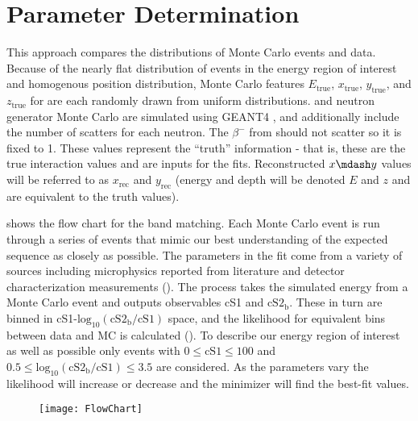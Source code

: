\section{Parameter Determination}
\label{sec:er_nr_calibrations_parameter_determ}
This approach compares the distributions of Monte Carlo events and data.  Because of the nearly flat distribution of events in the energy
region of interest and homogenous position distribution, Monte Carlo features $E_{\mathrm{true}}$, $x_{\mathrm{true}}$,
$y_{\mathrm{true}}$, and $z_{\mathrm{true}}$ for  are each randomly drawn from uniform distributions.   and
neutron generator Monte Carlo are simulated using GEANT4 , and additionally include the number of
scatters for each neutron.  The $\beta^-$ from  should not scatter so it is fixed to 1.  These values represent the
``truth'' information - that is, these are the true interaction values and are inputs for the fits.  Reconstructed $x \mdash y$ values
will be referred to as $x_{\mathrm{rec}}$
and $y_{\mathrm{rec}}$ (energy and depth will be denoted $E$ and $z$ and are equivalent to the truth values).

 shows the flow chart for the band matching.  Each Monte Carlo event is run
through a series of events that mimic our best understanding of the expected sequence as closely as possible.  The parameters in the fit
come from
a variety of sources including microphysics reported from literature and detector characterization measurements
().  The process takes the simulated energy from a Monte Carlo event and outputs observables cS1 and
$\mathrm{cS2_b}$.  These in turn are binned in cS1-$\mathrm{log_{10}(cS2_b / cS1)}$ space, and the likelihood for equivalent bins
between data and MC is calculated ().  To describe our energy region of
interest as well as possible only events with $0 \leq \mathrm{cS1} \leq 100$ and $0.5 \leq \mathrm{log_{10}(cS2_b / cS1)} \leq 3.5$ are
considered.  As the parameters vary the likelihood will increase or decrease and the minimizer will find the best-fit values.

\begin{figure}
\centering
\texttt{[image: FlowChart]}
\label{fig:er_nr_calibrations_parameter_determ_flow_chart}
\end{figure}

